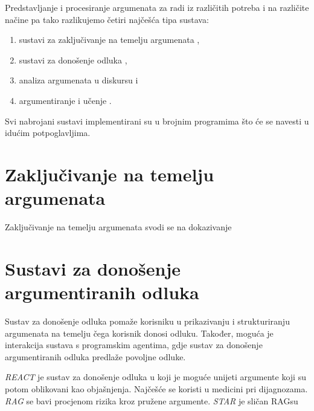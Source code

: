 Predstavljanje i procesiranje argumenata za radi iz različitih potreba i na različite načine pa tako razlikujemo četiri najčešća tipa sustava: 
\begin{enumerate}
\item sustavi za zaključivanje na temelju argumenata ,
\item sustavi za donošenje odluka ,
\item analiza argumenata u diskursu  i
\item argumentiranje i učenje .
\end{enumerate}

Svi nabrojani sustavi implementirani su u brojnim programima što će se navesti u idućim potpoglavljima.


\section{Zaključivanje na temelju argumenata}

Zaključivanje na temelju argumenata svodi se na dokazivanje 

\section{Sustavi za donošenje argumentiranih odluka}

Sustav za donošenje odluka pomaže korisniku u prikazivanju i strukturiranju argumenata na temelju čega korisnik donosi odluku. Također, moguća je interakcija sustava s programskim agentima, gdje sustav za donošenje argumentiranih odluka predlaže povoljne odluke.

\emph{REACT} je sustav za donošenje odluka u koji je moguće unijeti argumente koji su potom oblikovani kao objašnjenja. Najčešće se koristi u medicini pri dijagnozama. \emph{RAG} se bavi procjenom rizika  kroz pružene argumente. \emph{STAR} je sličan RAGsu 
